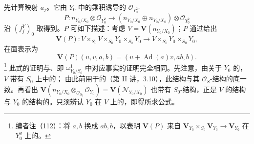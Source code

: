 先计算映射 $a_j$。它由 $Y_0$ 中的乘积诱导的 $\mathscr O_{Y_0^2}$-
\[P:n_{Y_0/X_0}\otimes\mathscr O_{Y_0^2}\longrightarrow(n_{Y_0/X_0}\oplus n_{Y_0/X_0})\otimes\mathscr O_{Y_0^2}\]
沿 $(f_j^Y)_0$ 取得到。$P$ 可如下描述：考虑 $V=\mathbf V(n_{Y_0/X_0})$；$P$ 通过给出
\[\mathbf V(P):V\times_{S_0}V\times_{S_0}Y_0\times_{S_0}Y_0\longrightarrow V\times_{S_0}Y_0\times_{S_0}Y_0,\]
在面表示为
\[\mathbf V(P)(u,v,a,b)=(u+\operatorname{Ad}(a)v,ab,b).\]
\footnote{编者注（112）：将 $a,b$ 换成 $ab,b$，以表明 $\mathbf V(P)$ 来自 $\mathbf V_{Y_0}\times_{S_0}\mathbf V_{Y_0}\to\mathbf V_{Y_0}$ 在 $Y_0^2$ 上的。}
此式的证明与、即 $\omega^1_{Y_0/S_0}$ 中对应事实的证明完全相同。先注意，由关于 $Y_0$ 的，$V$ 带有 $S_0$ 上中的；
由此前用于的（第 II 讲，3.10），此结构与其 $\mathscr O_S$-结构的底一致。再看出 $\mathbf V(n_{Y_0/X_0}\otimes_{\mathscr O_{S_0}}\mathscr O_{Y_0})=\mathbf V(\mathscr N_{Y_0/X_0})$ 也带有 $S_0$-结构，正是 $V$ 的结构与 $Y_0$ 的结构的。只须辨认 $Y_0$ 在 $V$ 上的，即得所求公式。

